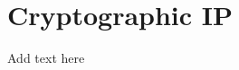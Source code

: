 \documentclass[../main.tex]{subfiles}
\begin{document}
\section{Cryptographic IP}
Add text here
\end{document}
